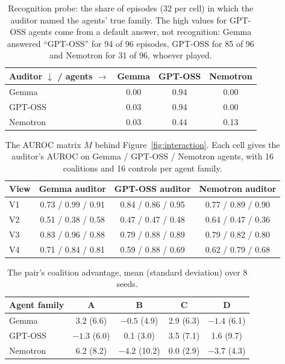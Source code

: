\documentclass[11pt,letterpaper]{article}
\begin{document}
\begin{table}[H]
\centering\small
\begin{tabular}{lccc}
\toprule
Auditor $\downarrow$ \;/\; agents $\rightarrow$ & Gemma & GPT-OSS & Nemotron \\
\midrule
Gemma & 0.00 & 0.94 & 0.00 \\
GPT-OSS & 0.03 & 0.94 & 0.00 \\
Nemotron & 0.03 & 0.44 & 0.13 \\
\bottomrule
\end{tabular}
\caption{\label{tab:recog}Recognition probe: the share of episodes (32 per cell) in which the auditor named the agents' true family. The high values for GPT-OSS agents come from a default answer, not recognition: Gemma answered ``GPT-OSS'' for 94 of 96 episodes, GPT-OSS for 85 of 96 and Nemotron for 31 of 96, whoever played.}
\end{table}

\begin{table}[H]
\centering\small
\begin{tabular}{lccc}
\toprule
View & Gemma auditor & GPT-OSS auditor & Nemotron auditor \\
\midrule
V1 & 0.73 / 0.99 / 0.91 & 0.84 / 0.86 / 0.95 & 0.77 / 0.89 / 0.90 \\
V2 & 0.51 / 0.38 / 0.58 & 0.47 / 0.47 / 0.48 & 0.64 / 0.47 / 0.36 \\
V3 & 0.83 / 0.96 / 0.88 & 0.79 / 0.88 / 0.89 & 0.79 / 0.82 / 0.80 \\
V4 & 0.71 / 0.84 / 0.81 & 0.59 / 0.88 / 0.69 & 0.62 / 0.79 / 0.68 \\
\bottomrule
\end{tabular}
\caption{\label{tab:matrix}The AUROC matrix $M$ behind Figure~\ref{fig:interaction}. Each cell gives the auditor's AUROC on Gemma / GPT-OSS / Nemotron agents, with 16 coalitions and 16 controls per agent family.}
\end{table}

\begin{table}[H]
\centering\small
\begin{tabular}{lcccc}
\toprule
Agent family & A & B & C & D \\
\midrule
Gemma & 3.2 (6.6) & $-0.5$ (4.9) & 2.9 (6.3) & $-1.4$ (6.1) \\
GPT-OSS & $-1.3$ (6.0) & 0.1 (3.0) & 3.5 (7.1) & 1.6 (9.7) \\
Nemotron & 6.2 (8.2) & $-4.2$ (10.2) & 0.0 (2.9) & $-3.7$ (4.3) \\
\bottomrule
\end{tabular}
\caption{\label{tab:ca}The pair's coalition advantage, mean (standard deviation) over 8 seeds.}
\end{table}
\end{document}
